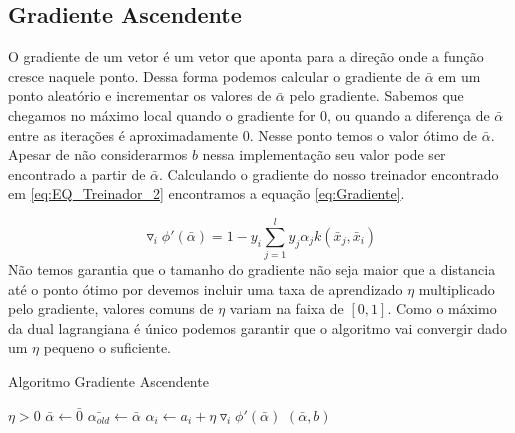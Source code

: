 \subsection{Gradiente Ascendente}
O gradiente de um vetor é um vetor que aponta para a direção onde a função cresce naquele ponto. Dessa forma podemos calcular o gradiente de $\bar{\alpha}$ em um ponto aleatório e incrementar os valores de $\bar{\alpha}$ pelo gradiente. Sabemos que chegamos no máximo local quando o gradiente for $0$, ou quando a diferença de $\bar{\alpha}$ entre as iterações é aproximadamente $0$. Nesse ponto temos o valor ótimo de $\bar{\alpha}$. Apesar de não considerarmos $b$ nessa implementação seu valor pode ser encontrado a partir de $\bar{\alpha}$. Calculando o gradiente do nosso treinador encontrado em \ref{eq:EQ_Treinador_2} encontramos a equação \ref{eq:Gradiente}.

\begin{equation}
    \triangledown_i {\phi}'(\bar{\alpha}) = 1-y_i\sum_{j=1}^ly_j\alpha_jk(\bar{x}_j,\bar{x}_i)
    \label{eq:Gradiente}
\end{equation}
Não temos garantia que o tamanho do gradiente não seja maior que a distancia até o ponto ótimo por devemos incluir uma taxa de aprendizado $\eta$ multiplicado pelo gradiente, valores comuns de $\eta$ variam na faixa de $[0,1]$. Como o máximo da dual lagrangiana é único podemos garantir que o algoritmo vai convergir dado um $\eta$ pequeno o suficiente.

\begin{algorithm}
\label{alg:gradiente}
\caption{Algoritmo Gradiente Ascendente}
\begin{algorithmic}
\STATE $\eta>0$
\STATE $\bar{\alpha} \leftarrow \bar{0}$
\REPEAT
\STATE $\bar{\alpha_{old}} \leftarrow \bar{\alpha}$
\STATE $\alpha_i \leftarrow a_i + \eta \triangledown_i {\phi}'(\bar{\alpha})$
\ENDFOR
{}
\RETURN $(\bar{\alpha},b)$
\end{algorithmic}
\end{algorithm}

